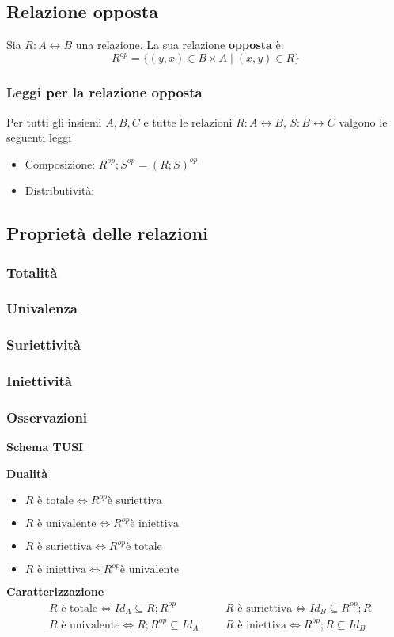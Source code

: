 \documentclass{article}
\begin{document}
\subsection{Relazione opposta}
Sia \(R: A \leftrightarrow B\) una relazione. La sua relazione \textbf{opposta} è:
\[R^{op} = \{(y,x) \in B \times A \mid (x,y) \in R\}\]

\subsubsection{Leggi per la relazione opposta}
Per tutti gli insiemi \(A,B,C\) e tutte le relazioni \(R: A \leftrightarrow B\), \(S: B \leftrightarrow C\) valgono le seguenti leggi
\begin{itemize}
    \item Composizione: \(R^{op};S^{op} = (R;S)^{op}\)
    \item Distributività: \(\)
\end{itemize}

\subsection{Proprietà delle relazioni}
\subsubsection{Totalità}
\subsubsection{Univalenza}
\subsubsection{Suriettività}
\subsubsection{Iniettività}
\subsubsection{Osservazioni}
\textbf{Schema TUSI}

\noindent\textbf{Dualità}
\begin{itemize}
    \item \(R \text{ è totale}     \iff R^{op} \text{è suriettiva}\)
    \item \(R \text{ è univalente} \iff R^{op} \text{è iniettiva}\)
    \item \(R \text{ è suriettiva} \iff R^{op} \text{è totale}\)
    \item \(R \text{ è iniettiva}  \iff R^{op} \text{è univalente}\)
\end{itemize}
\noindent\textbf{Caratterizzazione}
\begin{align*}
     & R \text{ è totale} \iff Id_A \subseteq R;R^{op}     &  &  & R \text{ è suriettiva} \iff Id_B \subseteq R^{op};R \\
     & R \text{ è univalente} \iff R;R^{op} \subseteq Id_A &  &  & R \text{ è iniettiva} \iff R^{op};R \subseteq Id_B
\end{align*}
\end{document}
